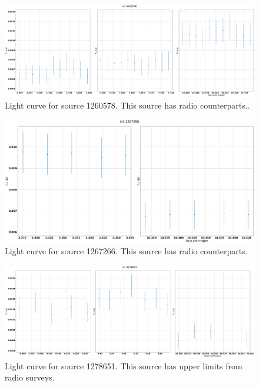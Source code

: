 \documentclass[12pt]{article}
\begin{document}
\begin{figure}
	\includegraphics[width=\textwidth]{src1260578multi.png}
	\caption{Light curve for source 1260578. This source has radio counterparts..}
	\label{fig:src1260578multi}
\end{figure}
\begin{figure}
	\includegraphics[width=\textwidth]{src1267266multi.png}
	\caption{Light curve for source 1267266. This source has radio counterparts.}
	\label{fig:src1267266multi}
\end{figure}
\begin{figure}
	\includegraphics[width=\textwidth]{src1278651multi.png}
	\caption{Light curve for source 1278651. This source has upper limits from radio surveys.}
	\label{fig:src1278651multi}
\end{figure}
\end{document}
